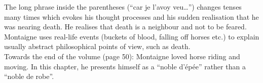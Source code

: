\documentclass{article}
\begin{document}
The long phrase inside the parentheses (``car je l'avoy veu\ldots'')
changes tenses many times which evokes his thought processes and his
sudden realisation that he was nearing death. He realises that death
is a neighbour and not to be feared.\\

Montaigne uses real-life events (buckets of blood, falling off horses
etc.) to explain usually abstract philosophical points of view, such
as death.\\

Towards the end of the volume (page 50): Montaigne loved horse riding
and moving. In this chapter, he presents himself as a ``noble
d'\'ep\'ee'' rather than a ``noble de robe''.\\
\end{document}
